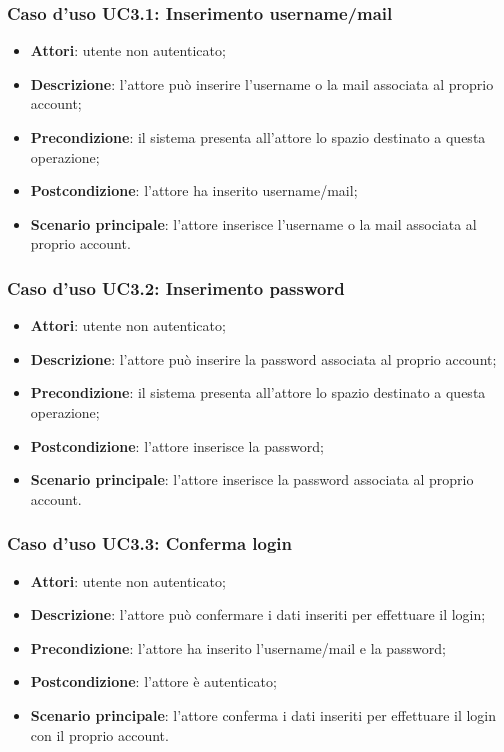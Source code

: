 \subsubsection{Caso d'uso UC3.1: Inserimento username/mail}
\begin{itemize}
	\item \textbf{Attori}: utente non autenticato;
	\item \textbf{Descrizione}: l'attore può inserire l'username o la mail associata al proprio account;
	\item \textbf{Precondizione}: il sistema presenta all'attore lo spazio destinato a questa operazione;
	\item \textbf{Postcondizione}: l'attore ha inserito username/mail;
	\item \textbf{Scenario principale}: l'attore inserisce l'username o la mail associata al proprio account. 
\end{itemize}

\subsubsection{Caso d'uso UC3.2: Inserimento password}
\begin{itemize}
	\item \textbf{Attori}: utente non autenticato;
	\item \textbf{Descrizione}: l'attore può inserire la password associata al proprio account;
	\item \textbf{Precondizione}: il sistema presenta all'attore lo spazio destinato a questa operazione;
	\item \textbf{Postcondizione}: l'attore inserisce la password;
	\item \textbf{Scenario principale}: l'attore inserisce la password associata al proprio account.
\end{itemize}

\subsubsection{Caso d'uso UC3.3: Conferma login}
\begin{itemize}
	\item \textbf{Attori}: utente non autenticato;
	\item \textbf{Descrizione}: l'attore può confermare i dati inseriti per effettuare il login;
	\item \textbf{Precondizione}: l'attore ha inserito l'username/mail e la password;
	\item \textbf{Postcondizione}: l'attore è autenticato;
	\item \textbf{Scenario principale}: l'attore conferma i dati inseriti per effettuare il login con il proprio account.
\end{itemize}

